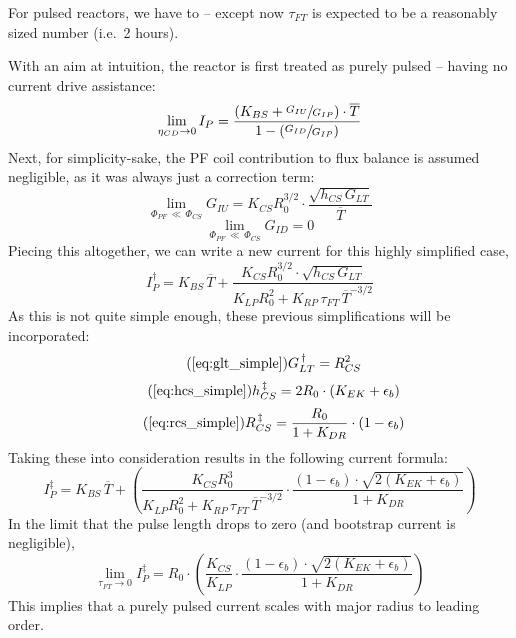 For pulsed reactors, we have to  -- except now $\tau_{FT}$ is expected to be a reasonably sized number (i.e.\ 2 hours).

With an aim at intuition, the reactor is first treated as purely pulsed -- having no current drive assistance:
\begin{equation}
	\lim_{\eta_{CD} \to 0} I_P = \frac{ \left( K_{BS} + \sfrac{ G_{IU} }{ G_{IP} } \right) \cdot \overline T }{ 1 - \left( \sfrac{ G_{ID} }{ G_{IP} } \right) }
\end{equation}
Next, for simplicity-sake, the PF coil contribution to flux balance is assumed negligible, as it was always just a correction term:
\begin{equation}
	\lim_{ \Phi_{PF} \, \ll \, \Phi_{CS} } G_{IU} = K_{CS} R_0^{3/2} \cdot \frac{ \sqrt{ h_{CS} \, G_{LT} } }{ \overline T }
\end{equation}
\begin{equation}
	\lim_{ \Phi_{PF} \, \ll \, \Phi_{CS} } G_{ID} = 0
\end{equation}
Piecing this altogether, we can write a new current for this highly simplified case,
\begin{equation}
	I_P^\dagger = K_{BS} \, \overline T + \frac{ K_{CS} R_0^{3/2} \cdot \sqrt{ h_{CS} \, G_{LT} } }{ K_{LP} R_0^2 + K_{RP} \, \tau_{FT} \, \overline T ^ {-3/2} }
\end{equation}
As this is not quite simple enough, these previous simplifications will be incorporated:
\begin{equation}
	\tag{\ref{eq:glt_simple}}
	G_{LT}^{\,\dagger} = R_{CS}^2
\end{equation}
\begin{equation}
	\tag{\ref{eq:hcs_simple}}
	h_{CS}^{\,\ddagger} = 2 R_0 \cdot \left( K_{EK} + \epsilon_b \right)
\end{equation}
\begin{equation}
	\tag{\ref{eq:rcs_simple}}
	R_{CS}^{\,\ddagger} = \frac{ R_0 }{ 1 + K_{DR} } \cdot \left( 1 - \epsilon_b  \right)
\end{equation}
Taking these into consideration results in the following current formula:
\begin{equation}
	I_P^\ddagger = K_{BS} \, \overline T + \left( \frac{ K_{CS} R_0^3 }{ K_{LP} R_0^2 + K_{RP} \, \tau_{FT} \, \overline T ^ {-3/2} } \cdot \frac{ ( 1 - \epsilon_b ) \cdot \sqrt{ 2 ( K_{EK} + \epsilon_b ) } }{ 1 + K_{DR} } \right)
\end{equation}
In the limit that the pulse length drops to zero (and bootstrap current is negligible),
\begin{equation}
	\label{eq:tau_zero}
	\lim_{ \tau_{FT} \to 0 } I_P^\ddagger = R_0 \cdot \left( \frac{ K_{CS} }{ K_{LP} } \cdot \frac{ ( 1 - \epsilon_b ) \cdot \sqrt{ 2 ( K_{EK} + \epsilon_b ) } }{ 1 + K_{DR} } \right)
\end{equation}
This implies that a purely pulsed current scales with major radius to leading order.

